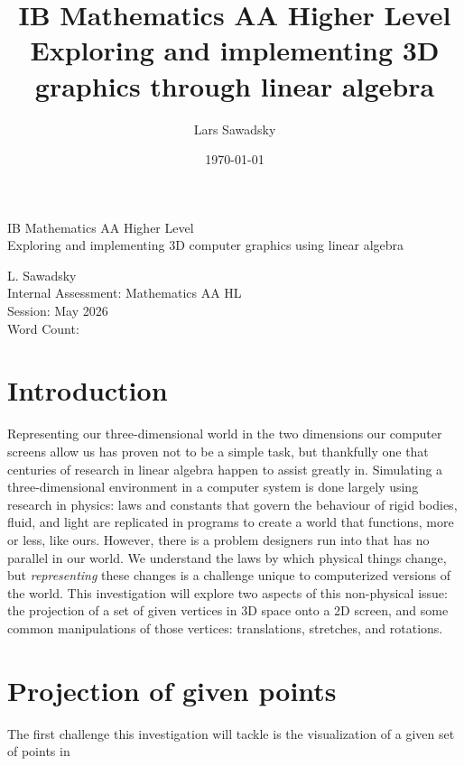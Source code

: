 \documentclass[12pt, a4paper]{article}
\title{
    IB Mathematics AA Higher Level\\
    
    Exploring and implementing 3D graphics through linear algebra
}
\author{Lars Sawadsky}
\date{\today}
\begin{document}
    \begin{titlepage}
        \begin{center}
            \vspace*{9cm}

            IB Mathematics AA Higher Level\\
            \medskip
            Exploring and implementing 3D computer graphics using linear algebra

            \vspace{8cm}

            L. Sawadsky\\
            Internal Assessment: Mathematics AA HL\\
            Session: May 2026\\
            Word Count:
        \end{center}
        \newpage
    \end{titlepage}

    \tableofcontents
    \newpage

    \section*{Introduction}
    
    Representing our three-dimensional world in the two dimensions
    our computer screens allow us has proven not to be a simple task,
    but thankfully one that centuries of research in linear algebra
    happen to assist greatly in. Simulating a three-dimensional 
    environment in a computer system is done largely using research
    in physics: laws and constants that govern the behaviour of rigid
    bodies, fluid, and light are replicated in programs to create a
    world that functions, more or less, like ours. However, there is 
    a problem designers run into that has no parallel in our world. 
    We understand the laws by which physical things change, but \textit{representing} 
    these changes is a challenge unique to computerized versions of
    the world. This investigation will explore two aspects of this non-physical 
    issue: the projection of a set of given vertices in 3D space 
    onto a 2D screen, and some
    common manipulations of those vertices: translations, stretches, 
    and rotations. 

    \section*{Projection of given points}

    The first challenge this investigation will tackle is the visualization of a given set of points in 

    
\end{document}
